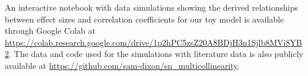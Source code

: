 An interactive notebook with data simulations showing the derived relationships between effect sizes and correlation coefficients for our toy model is available through Google Colab at \url{https://colab.research.google.com/drive/1p2hPC5zsZ20A8BDjH3n1Sjlb8MVi8YB2}. The data and code used for the simulations with literature data is also publicly available at \url{https://github.com/sam-dixon/sn_multicollinearity}.
